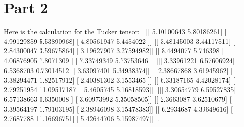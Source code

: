\documentclass{article}%
\begin{document}
\section{Part 2}%
\label{sec:Part2}%
Here is the calculation for the Tucker tensor: {[}{[}{[}{[} 5.10100643  5.80186261{]}\newline%
   {[} 4.99129859  5.53890968{]}\newline%
   {[} 4.80561947  5.4454022 {]}{]}\newline%
\newline%
  {[}{[} 3.48145003  3.44117511{]}\newline%
   {[} 2.84300047  3.59675864{]}\newline%
   {[} 3.19627907  3.27594982{]}{]}\newline%
\newline%
  {[}{[} 8.4494077   5.746398  {]}\newline%
   {[} 4.06876905  7.8071309 {]}\newline%
   {[} 7.33749349  5.73753646{]}{]}{]}\newline%
\newline%
\newline%
 {[}{[}{[} 3.33961221  6.57606924{]}\newline%
   {[} 6.5368703   0.73014512{]}\newline%
   {[} 3.63097401  5.34938374{]}{]}\newline%
\newline%
  {[}{[} 2.38667868  3.61945962{]}\newline%
   {[} 3.38294471  1.82517912{]}\newline%
   {[} 2.40381302  3.1553465 {]}{]}\newline%
\newline%
  {[}{[} 6.33187165  4.42028174{]}\newline%
   {[} 2.79251954 11.09517187{]}\newline%
   {[} 5.4605745   5.16818593{]}{]}{]}\newline%
\newline%
\newline%
 {[}{[}{[} 3.30654779  6.59527835{]}\newline%
   {[} 6.57138663  0.6350008 {]}\newline%
   {[} 3.60973992  5.35058505{]}{]}\newline%
\newline%
  {[}{[} 2.3663087   3.62510679{]}\newline%
   {[} 3.39564197  1.79103195{]}\newline%
   {[} 2.38946098  3.15478383{]}{]}\newline%
\newline%
  {[}{[} 6.2934687   4.39649616{]}\newline%
   {[} 2.7687788  11.16696751{]}\newline%
   {[} 5.42644706  5.15987497{]}{]}{]}{]}.\newline%
\newline%
\end{document}
